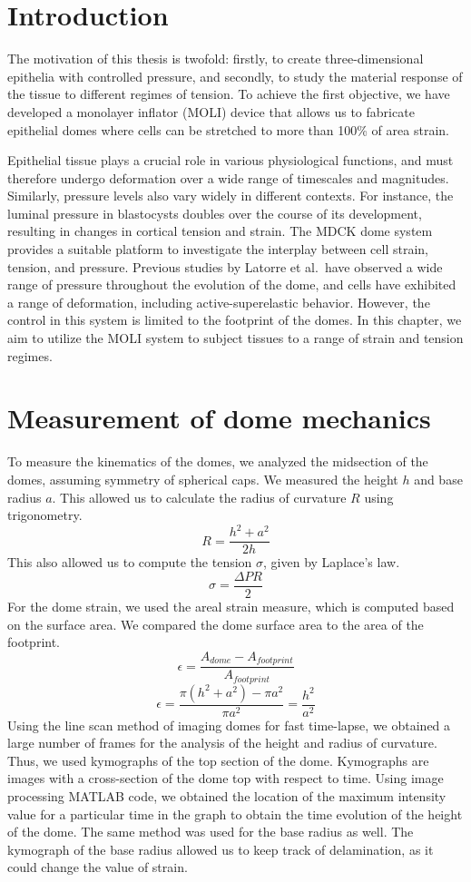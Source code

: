 \hypertarget{introduction}{%
\section{Introduction}\label{introduction2}}

The motivation of this thesis is twofold: firstly, to create
three-dimensional epithelia with controlled pressure, and secondly, to
study the material response of the tissue to different regimes of
tension. To achieve the first objective, we have developed a monolayer
inflator (MOLI) device that allows us to fabricate epithelial domes
where cells can be stretched to more than 100\% of area strain.

Epithelial tissue plays a crucial role in various physiological
functions, and must therefore undergo deformation over a wide range of
timescales and magnitudes. Similarly, pressure levels also vary widely
in different contexts. For instance, the luminal pressure in blastocysts
doubles over the course of its development, resulting in changes in
cortical tension and strain. The MDCK dome system provides a suitable
platform to investigate the interplay between cell strain, tension, and
pressure. Previous studies by Latorre et al.~have observed a wide range
of pressure throughout the evolution of the dome, and cells have
exhibited a range of deformation, including active-superelastic
behavior. However, the control in this system is limited to the
footprint of the domes. In this chapter, we aim to utilize the MOLI
system to subject tissues to a range of strain and tension regimes.
\hypertarget{measurement-of-dome-mechanics}{%
	\section{Measurement of dome
		mechanics}\label{measurement-of-dome-mechanics}}

To measure the kinematics of the domes, we analyzed the midsection of
the domes, assuming symmetry of spherical caps. We measured the height
\(h\) and base radius \(a\). This allowed us to calculate the radius of
curvature \(R\) using trigonometry. \[ R = \frac{h^2 + a^2}{2h} \] This
also allowed us to compute the tension \(\sigma\), given by Laplace's
law. \[\sigma = \frac{\Delta PR }{2}\] For the dome strain, we used the
areal strain measure, which is computed based on the surface area. We
compared the dome surface area to the area of the footprint.
\[ \epsilon = \frac{A_{dome } - A_{footprint}}{A_{footprint}} \]
\[ \epsilon = \frac{\pi(h^2 + a^2) - \pi a^2}{\pi a^2} = \frac{h^2}{a^2}\]
Using the line scan method of imaging domes for fast time-lapse, we
obtained a large number of frames for the analysis of the height and
radius of curvature. Thus, we used kymographs of the top section of the
dome. Kymographs are images with a cross-section of the dome top with
respect to time. Using image processing MATLAB code, we obtained the
location of the maximum intensity value for a particular time in the
graph to obtain the time evolution of the height of the dome. The same
method was used for the base radius as well. The kymograph of the base
radius allowed us to keep track of delamination, as it could change the
value of strain.

